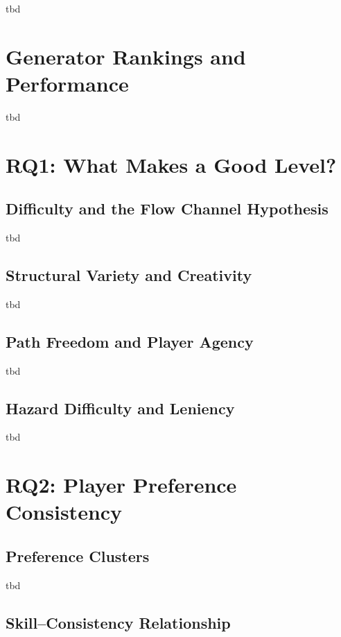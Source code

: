 \documentclass[shortabstract, mgr, english]{iithesis}
\begin{document}
tbd

\section{Generator Rankings and Performance}
\label{sec:eda-rankings}

tbd

\section{RQ1: What Makes a Good Level?}
\label{sec:eda-rq1}

\subsection{Difficulty and the Flow Channel Hypothesis}
\label{subsec:eda-h1}

tbd

\subsection{Structural Variety and Creativity}
\label{subsec:eda-h2}

tbd

\subsection{Path Freedom and Player Agency}
\label{subsec:eda-h3}

tbd

\subsection{Hazard Difficulty and Leniency}
\label{subsec:eda-h8h9}

tbd

\section{RQ2: Player Preference Consistency}
\label{sec:eda-rq2}

\subsection{Preference Clusters}
\label{subsec:eda-h4}

tbd

\subsection{Skill--Consistency Relationship}
\label{subsec:eda-h5}
\end{document}
